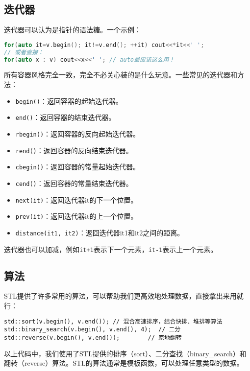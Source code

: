 \documentclass[../main.tex]{subfiles}
\begin{document}
\subsection{迭代器}

迭代器可以认为是指针的语法糖。一个示例：
\begin{lstlisting}[language=C++]
for(auto it=v.begin(); it!=v.end(); ++it) cout<<*it<<' ';
// 或者直接：
for(auto x : v) cout<<x<<' '; // auto最应该这么用！
\end{lstlisting}

所有容器风格完全一致，完全不必关心装的是什么玩意。一些常见的迭代器和方法：
\begin{itemize}
  \item \texttt{begin()}：返回容器的起始迭代器。
  \item \texttt{end()}：返回容器的结束迭代器。
  \item \texttt{rbegin()}：返回容器的反向起始迭代器。
  \item \texttt{rend()}：返回容器的反向结束迭代器。
  \item \texttt{cbegin()}：返回容器的常量起始迭代器。
  \item \texttt{cend()}：返回容器的常量结束迭代器。
  \item \texttt{next(it)}：返回迭代器it的下一个位置。
  \item \texttt{prev(it)}：返回迭代器it的上一个位置。
  \item \texttt{distance(it1, it2)}：返回迭代器it1和it2之间的距离。
\end{itemize}

迭代器也可以加减，例如\texttt{it+1}表示下一个元素，\texttt{it-1}表示上一个元素。

\subsection{算法}
STL提供了许多常用的算法，可以帮助我们更高效地处理数据，直接拿出来用就行：
\begin{lstlisting}
std::sort(v.begin(), v.end()); // 混合高速排序，结合快排、堆排等算法
std::binary_search(v.begin(), v.end(), 4);  // 二分
std::reverse(v.begin(), v.end());        // 原地翻转
\end{lstlisting}

以上代码中，我们使用了STL提供的排序（sort）、二分查找（binary\_search）和翻转（reverse）算法。STL的算法通常是模板函数，可以处理任意类型的数据。
\end{document}
